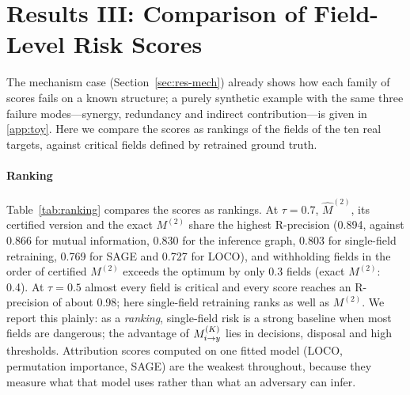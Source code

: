 \section{Results III: Comparison of Field-Level Risk Scores}\label{sec:res-def}

The mechanism case (Section~\ref{sec:res-mech}) already shows how each family of scores fails on a
known structure; a purely synthetic example with the same three failure modes---synergy, redundancy
and indirect contribution---is given in \ref{app:toy}. Here we compare the scores as rankings of the
fields of the ten real targets, against critical fields defined by retrained ground truth.

\paragraph{Ranking}
Table~\ref{tab:ranking} compares the scores as rankings. At $\tau=0.7$, $\hat M^{(2)}$, its certified
version and the exact $M^{(2)}$ share the highest R-precision (0.894, against 0.866 for mutual information, 0.830 for the
inference graph, 0.803 for single-field retraining, 0.769 for SAGE and 0.727 for LOCO), and withholding fields in
the order of certified $M^{(2)}$ exceeds the optimum by only 0.3 fields (exact $M^{(2)}$: 0.4). At $\tau=0.5$
almost every field is critical and every score reaches an R-precision of about 0.98; here
single-field retraining ranks as well as $M^{(2)}$. We report this plainly: as a \emph{ranking},
single-field risk is a strong baseline when most fields are dangerous; the advantage of $M^{(K)}_{i \to y}$
lies in decisions, disposal and high thresholds. Attribution scores computed on one fitted
model (LOCO, permutation importance, SAGE) are the weakest throughout, because they measure what
that model uses rather than what an adversary can infer.




